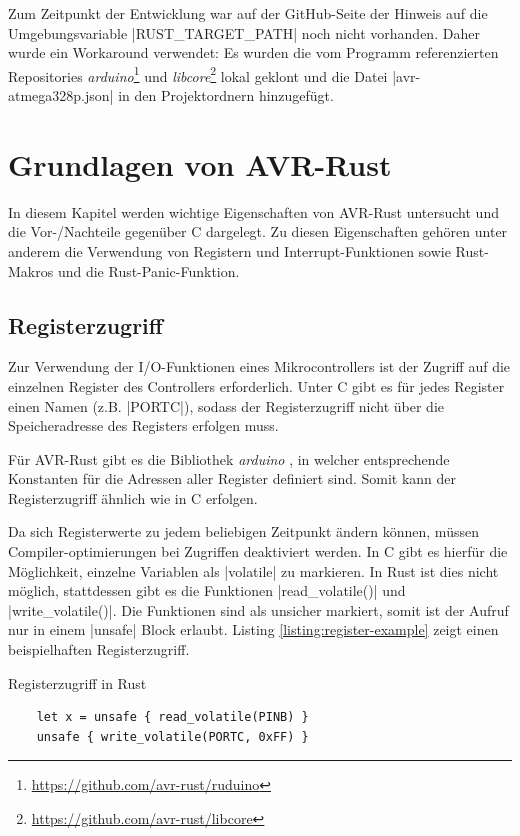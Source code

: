 \documentclass
[ 12pt,
  parskip=half %
]{scrreprt}
\newenvironment{mylisting}[1][H]
{\captionsetup{aboveskip=-0.2\normalbaselineskip}\begin{listing}[#1]}
{\end{listing}}
\begin{document}
Zum Zeitpunkt der Entwicklung war auf der GitHub-Seite der Hinweis auf die Umgebungsvariable \bashinline|RUST_TARGET_PATH| noch nicht vorhanden. Daher wurde ein Workaround \cite{xargo-workaraound} verwendet: Es wurden die vom Programm referenzierten Repositories   \textit{arduino}\footnote{\url{https://github.com/avr-rust/ruduino}} und \textit{libcore}\footnote{\url{https://github.com/avr-rust/libcore}} lokal geklont und die Datei \bashinline|avr-atmega328p.json| in den Projektordnern hinzugefügt. 

\chapter{Grundlagen von AVR-Rust}

In diesem Kapitel werden wichtige Eigenschaften von AVR-Rust untersucht und die Vor-/Nachteile gegenüber C dargelegt. Zu diesen Eigenschaften gehören unter anderem die Verwendung von Registern und Interrupt-Funktionen sowie Rust-Makros und die Rust-Panic-Funktion.

\section{Registerzugriff}

Zur Verwendung der I/O-Funktionen eines Mikrocontrollers ist der Zugriff auf die einzelnen Register des Controllers erforderlich. Unter C gibt es für jedes Register einen Namen (z.B. \cinline|PORTC|), sodass der Registerzugriff nicht über die Speicheradresse des Registers erfolgen muss.

Für AVR-Rust gibt es die Bibliothek \textit{arduino} \cite{github-arduino}, in welcher entsprechende Konstanten für die Adressen aller Register definiert sind. Somit kann der Registerzugriff ähnlich wie in C erfolgen. 

Da sich Registerwerte zu jedem beliebigen Zeitpunkt ändern können, müssen Compiler-optimierungen bei Zugriffen deaktiviert werden. In C gibt es hierfür die Möglichkeit, einzelne Variablen als \cinline|volatile| zu markieren. In Rust ist dies nicht möglich, stattdessen gibt es die Funktionen \rustinline|read_volatile()| und \rustinline|write_volatile()|. Die Funktionen sind als unsicher markiert, somit ist der Aufruf nur in einem \rustinline|unsafe| Block erlaubt. Listing \ref{listing:register-example} zeigt einen beispielhaften Registerzugriff.

\begin{mylisting}
	\caption{Registerzugriff in Rust}
	\label{listing:register-example}
	\begin{verbatim}
	let x = unsafe { read_volatile(PINB) }
	unsafe { write_volatile(PORTC, 0xFF) }
	\end{verbatim}
\end{mylisting} 
\end{document}
